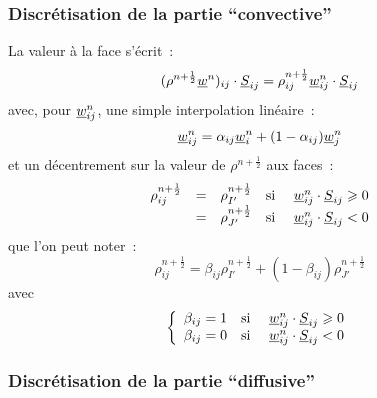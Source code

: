 \subsubsection*{Discrétisation de la partie ``convective''}

La valeur à la face s'écrit~:
\begin{equation}
(\rho^{n+\frac{1}{2}} \underline{w}^n)_{ij} \cdot \underline{S}_{ij}
= \rho^{n+\frac{1}{2}}_{ij} \underline{w}^n_{ij} \cdot \underline{S}_{ij}
\end{equation}
avec, pour $\underline{w}^n_{ij}$,
une simple interpolation linéaire~:
\begin{equation}
\underline{w}^n_{ij}
= \alpha_{ij} \underline{w}^n_i + (1-\alpha_{ij}) \underline{w}^n_j
\end{equation}
et un décentrement sur la valeur de $\rho^{n+\frac{1}{2}}$ aux faces~:
\begin{equation}
\begin{array}{lllll}
\displaystyle\rho_{ij}^{n+\frac{1}{2}} &=& \rho_{I'}^{n+\frac{1}{2}}
                &\text{si\ }& \underline{w}^n_{ij} \cdot \underline{S}_{ij} \geqslant 0 \\
                         &=& \rho_{J'}^{n+\frac{1}{2}}
                &\text{si\ }& \underline{w}^n_{ij} \cdot \underline{S}_{ij} < 0 \\
\end{array}
\end{equation}
que l'on peut noter~:
\begin{equation}
\displaystyle\rho_{ij}^{n+\frac{1}{2}}
 = \beta_{ij}\rho_{I'}^{n+\frac{1}{2}} + (1-\beta_{ij})\rho_{J'}^{n+\frac{1}{2}}
\end{equation}
avec
\begin{equation}
\left\{\begin{array}{lll}
\beta_{ij} = 1 & \text{si\ } & \underline{w}^n_{ij} \cdot \underline{S}_{ij} \geqslant 0 \\
\beta_{ij} = 0 & \text{si\ } & \underline{w}^n_{ij} \cdot \underline{S}_{ij} < 0 \\
\end{array}\right.
\end{equation}

\subsubsection*{Discrétisation de la partie ``diffusive''}

